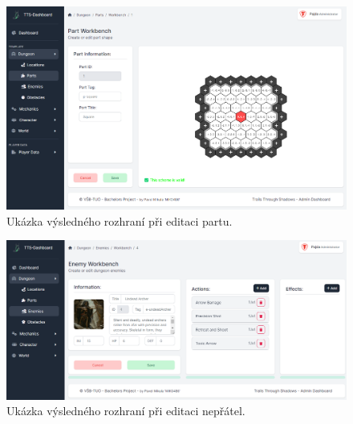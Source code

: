 \begin{figure}
    \centering
    \includegraphics[width=1.0\textwidth]{figures/dashboardWorkbenchPart}
    \caption{Ukázka výsledného rozhraní při editaci partu.}
    \label{fig:interfaceScreenshotsWorkbench}
\end{figure}

\begin{figure}
    \centering
    \includegraphics[width=1.0\textwidth]{figures/dashboardWorkbenchEnemy}
    \caption{Ukázka výsledného rozhraní při editaci nepřátel.}
    \label{fig:interfaceScreenshotsWorkbench2}
\end{figure}

\endinput